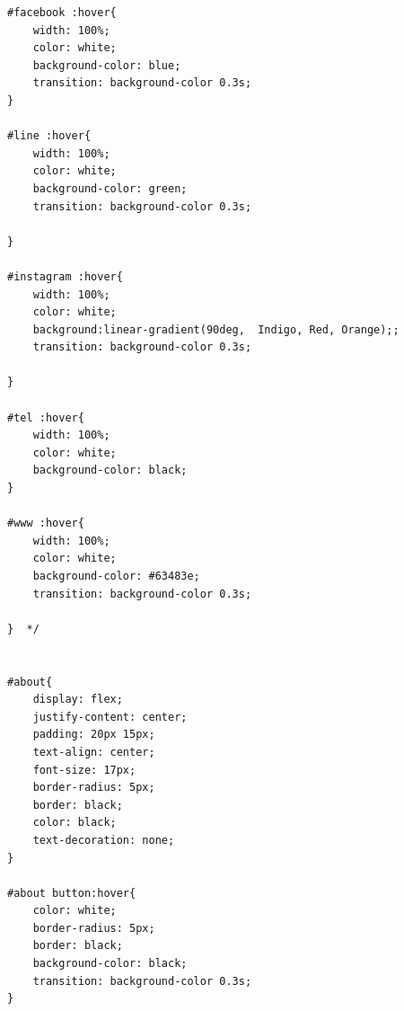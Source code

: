 \documentclass{report}
\begin{document}
\begin{verbatim}
#facebook :hover{
    width: 100%;
    color: white;
    background-color: blue;
    transition: background-color 0.3s;
}

#line :hover{
    width: 100%;
    color: white;
    background-color: green;
    transition: background-color 0.3s;

} 

#instagram :hover{
    width: 100%;
    color: white;
    background:linear-gradient(90deg,  Indigo, Red, Orange);;
    transition: background-color 0.3s;

} 

#tel :hover{
    width: 100%;
    color: white;
    background-color: black;
}

#www :hover{
    width: 100%;
    color: white;
    background-color: #63483e;
    transition: background-color 0.3s;

}  */


#about{
    display: flex;
    justify-content: center;
    padding: 20px 15px;
    text-align: center;
    font-size: 17px;
    border-radius: 5px;
    border: black;
    color: black;
    text-decoration: none;
}

#about button:hover{
    color: white;
    border-radius: 5px;
    border: black;
    background-color: black;
    transition: background-color 0.3s;
}
\end{verbatim}
\end{document}
